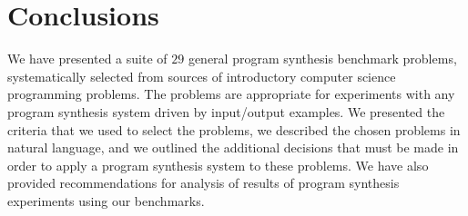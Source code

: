 \documentclass{sig-alternate}
\begin{document}
%
%



\section{Conclusions}

We have presented a suite of $29$ general program synthesis benchmark problems, systematically selected from sources of introductory computer science programming problems. 
The problems are appropriate for experiments with any program synthesis system driven by input/output examples. 
We presented the criteria that we used to select the problems, we described the chosen problems in natural language, and we outlined the additional decisions that must be made in order to apply a program synthesis system to these problems. We have also provided recommendations for analysis of results of program synthesis experiments using our benchmarks.
\end{document}
